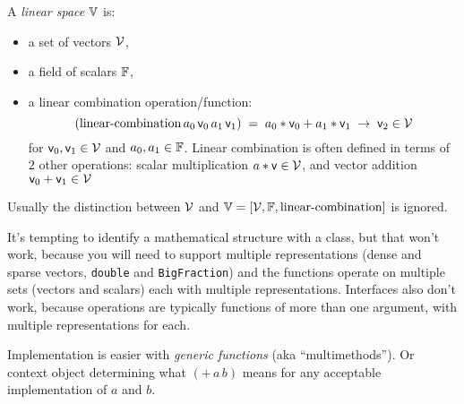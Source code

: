 \begin{example}
\bigskip
A \textit{linear space} $\mathbb{V}$ is:
\begin{itemize}
  \item a set of vectors $\mathcal{V}$,
  \item a field of scalars $\mathbb{F}$,
  \item a linear combination operation/function: 
\begin{equation}
\left( \text{linear-combination} 
\, a_0 \, \mathsf{v}_0 \, a_1 \, \mathsf{v}_1 \right) \; 
= \; a_0*\mathsf{v}_0 + a_1*\mathsf{v}_1
\; \rightarrow \; \mathsf{v}_2  \in \mathcal{V}
\end{equation}
for $\mathsf{v}_0, \mathsf{v}_1 \in \mathcal{V} $
and $a_0, a_1 \in \mathbb{F}$.
Linear combination is often defined in terms of
$2$ other operations:
scalar multiplication $a * \mathsf{v} \in \mathcal{V}$,
and vector addition $\mathsf{v}_0 + \mathsf{v}_1 \in \mathcal{V}$
\end{itemize}
Usually the distinction between $\mathcal{V}$ and 
$\mathbb{V} = \left[ \mathcal{V}, \mathbb{F}, \text{linear-combination} \right]$
is ignored.
\end{example}

It's tempting to identify a mathematical structure with a class,
but that won't work, because you will need to support multiple
representations (dense and sparse vectors, \texttt{double}
and \texttt{BigFraction}) and the functions
operate on multiple sets (vectors and scalars)
each with multiple representations.
Interfaces also don't work, because 
operations are typically functions of more than one argument,
with multiple representations for each.

Implementation is easier with \textit{generic functions}
(aka ``multimethods'').
Or context object determining what $\left(+ \, a \, b \right)$
means for any acceptable implementation of $a$ and $b$.

